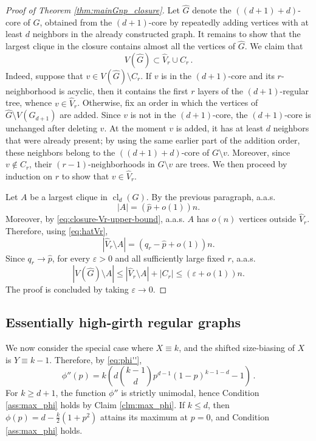 \documentclass[reqno,english]{amsart}
\numberwithin{equation}{section}
\theoremstyle{definition}{
\newtheorem{example}[theorem]{Example}
\newtheorem{definition}[theorem]{Definition}
\newtheorem*{definition*}{Definition}
\newtheorem{problem}[theorem]{Problem}
\newtheorem{question}[theorem]{Question}
}
\begin{document}
\begin{proof}[Proof of Theorem \ref{thm:mainGnp_closure}]
\medskip

Let \(\widehat G\) denote the \(((d+1)+d)\)-core of \(G\),
obtained from the
$(d+1)$-core by repeatedly adding vertices with at least $d$ neighbors in the already constructed graph.
It remains to show that the largest clique in the closure contains almost all the vertices of $\widehat G$. We claim that 
$$V(\widehat G)\subset \widehat V_r \cup C_r\,.$$
Indeed, suppose that $v\in V(\widehat G)\setminus C_r$. If $v$ is in the $(d+1)$-core and its $r$-neighborhood is
acyclic, then it contains the first $r$ layers of the $(d+1)$-regular
tree, whence $v\in \widehat V_r$. Otherwise, fix an order in which the vertices of
\(\widehat G\setminus V(G_{d+1})\) are added. Since \(v\) is not in the
\((d+1)\)-core, the \((d+1)\)-core is unchanged after deleting \(v\).
At the moment \(v\) is added, it has at least \(d\) neighbors that were
already present; by using the same earlier part of the addition order,
these neighbors belong to the \(((d+1)+d)\)-core of \(G\setminus v\).
Moreover, since \(v\notin C_r\), their \((r-1)\)-neighborhoods in
\(G\setminus v\) are trees. We then proceed by induction on \(r\) to show
that \(v\in \widehat V_r\).

Let \(A\) be a largest clique in \(\operatorname{cl}_d(G)\). By the previous paragraph, a.a.s.
\[
    |A|=(\hat p+o(1))n.
\]
Moreover, by \eqref{eq:closure-Vr-upper-bound}, a.a.s. \(A\) has \(o(n)\) vertices outside
\(\widehat V_r\).
Therefore, using \eqref{eq:hatVr},
\[
    |\widehat V_r\setminus A|
    =
    (q_r-\hat p+o(1))n.
\]
Since \(q_r\to \hat p\), for every \(\varepsilon>0\) and all sufficiently large fixed \(r\), a.a.s.
\[
|V(\widehat G)\setminus A|
\le
|\widehat V_r\setminus A|+|C_r|
\le
(\varepsilon+o(1))n .
\]
The proof is concluded by taking \(\varepsilon\to 0\).

\end{proof}

\subsection{Essentially high-girth regular graphs}
\label{sec:regular}
We now consider the special case where \(X\equiv k\), and the shifted
size-biasing of \(X\) is \(Y\equiv k-1\).
Therefore, by \eqref{eq:phi''},
\[
\phi''(p)=k\left(
d \binom{k-1}{d}p^{d-1}(1-p)^{k-1-d}-1
\right)\,.
\]
For \(k\ge d+1\), the function $\phi''$ is strictly unimodal, hence Condition \ref{ass:max_phi} holds by Claim \ref{clm:max_phi}. If \(k\le d\), then 
$\phi(p)=d-\frac{k}{2}(1+p^2)$ attains its maximum at $p=0$, and Condition \ref{ass:max_phi} holds.
\end{document}
